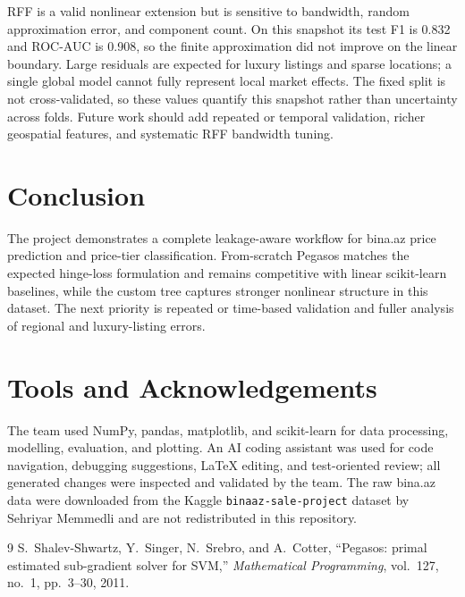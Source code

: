 \documentclass[10pt,twocolumn,a4paper]{article}
\begin{document}
RFF is a valid nonlinear extension but is sensitive to bandwidth, random
approximation error, and component count. On this snapshot its test F1
is 0.832 and ROC-AUC is 0.908, so the finite approximation did not
improve on the linear boundary. Large residuals are expected for luxury
listings and sparse locations; a single global model cannot fully
represent local market effects. The fixed split is not cross-validated,
so these values quantify this snapshot rather than uncertainty across
folds. Future work should add repeated or temporal validation, richer
geospatial features, and systematic RFF bandwidth tuning.

\section{Conclusion}
The project demonstrates a complete leakage-aware workflow for bina.az
price prediction and price-tier classification. From-scratch Pegasos
matches the expected hinge-loss formulation and remains competitive with
linear scikit-learn baselines, while the custom tree captures stronger
nonlinear structure in this dataset. The next priority is repeated or
time-based validation and fuller analysis of regional and luxury-listing
errors.

\section*{Tools and Acknowledgements}
The team used NumPy, pandas, matplotlib, and scikit-learn for data
processing, modelling, evaluation, and plotting. An AI coding assistant
was used for code navigation, debugging suggestions, LaTeX editing, and
test-oriented review; all generated changes were inspected and validated
by the team. The raw bina.az data were downloaded from the Kaggle
\texttt{binaaz-sale-project} dataset by Sehriyar Memmedli and are not
redistributed in this repository.

\begin{thebibliography}{9}
S.~Shalev-Shwartz, Y.~Singer, N.~Srebro, and A.~Cotter,
``Pegasos: primal estimated sub-gradient solver for SVM,''
\emph{Mathematical Programming}, vol.~127, no.~1, pp.~3--30, 2011.
\end{thebibliography}
\end{document}
